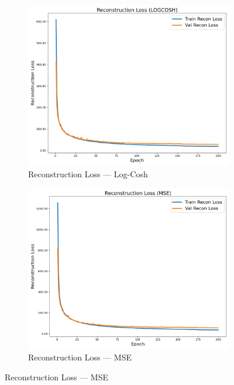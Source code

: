 \begin{figure}[p]
    \begin{subfigure}[b]{0.48\textwidth}
        \includegraphics[width=\textwidth]{img/vae_results/200_epochs_128_ls_logcosh/logcosh_recon_loss.png}
        \caption{Reconstruction Loss — Log-Cosh}
    \end{subfigure}
    \hfill
    \begin{subfigure}[b]{0.48\textwidth}
        \includegraphics[width=\textwidth]{img/vae_results/200_epochs_128_ls_mse/mse_recon_loss.png}
        \caption{Reconstruction Loss — MSE}
    \end{subfigure}


\end{figure}
